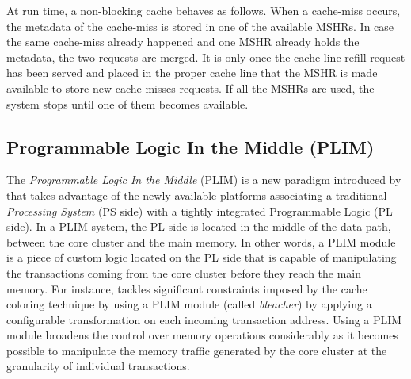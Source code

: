         At run time, a non-blocking cache behaves as follows. When a cache-miss occurs, the metadata of the cache-miss is stored in one of the available MSHRs. In case the same cache-miss already happened and one MSHR already holds the metadata, the two requests are merged.
        It is only once the cache line refill request has been served and placed in the proper cache line that the MSHR is made available to store new cache-misses requests.
        If all the MSHRs are used, the system stops until one of them becomes available.

    \subsection{Programmable Logic In the Middle (PLIM)}

        The \emph{Programmable Logic In the Middle} (PLIM) is a new paradigm introduced by \cite{PLIM20} that takes advantage of the newly available platforms associating a traditional \emph{Processing System} (PS side) with a tightly integrated Programmable Logic (PL side).
        In a PLIM system, the PL side is located in the middle of the data path, between the core cluster and the main memory.
        In other words, a PLIM module is a piece of custom logic located on the PL side that is capable of manipulating the transactions coming from the core cluster before they reach the main memory.
        For instance, \cite{PLIM20} tackles significant constraints imposed by the cache coloring technique by using a PLIM module (called \emph{bleacher}) by applying a configurable transformation on each incoming transaction address.
        Using a PLIM module broadens the control over memory operations considerably as it becomes possible to manipulate the memory traffic generated by the core cluster at the granularity of individual transactions.
